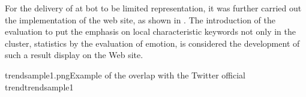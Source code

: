 
For the delivery of at bot to be limited representation, it was further carried out the implementation of the web site, as shown in  \cite{trend_elzup_com}.
The introduction of the evaluation to put the emphasis on local characteristic keywords not only in the cluster, statistics by the evaluation of emotion, is considered the development of such a result display on the Web site.


{trendsample1.png}{Example of the overlap with the Twitter official trend}{trendsample1}


\newpage
